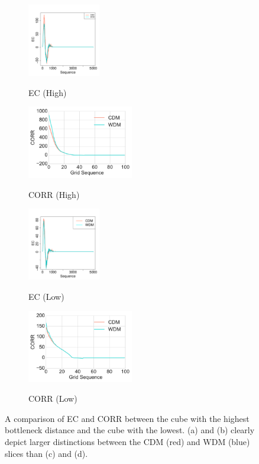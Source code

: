 \documentclass[12pt]{article}
\begin{document}
\begin{figure}[htp!]
  \centering
    \begin{subfigure}{0.21\textwidth}
    \centering
        \caption{EC (High)}
\includegraphics[height = 1.25in]{figure_13_max_margin_2euler.pdf}
    \label{fig:valid1}
  \end{subfigure}
    \begin{subfigure}{0.24\textwidth}
    \centering
        \caption{CORR (High)}
\includegraphics[height = 1.25in]{figure_13_max_margin_corr.pdf}
    \label{fig:valid2}
  \end{subfigure}
    \begin{subfigure}{0.21\textwidth}
    \centering
        \caption{EC (Low)}
\includegraphics[height = 1.25in]{figure_13_min_margin_2euler.pdf}
    \label{fig:valid3}
  \end{subfigure}
    \begin{subfigure}{0.24\textwidth}
    \centering
        \caption{CORR (Low)}
\includegraphics[height = 1.25in]{figure_13_min_margin_corr.pdf}
    \label{fig:valid4}
  \end{subfigure}
    \caption{A comparison of EC and CORR between the cube with the highest bottleneck distance and the cube with the lowest. (a) and (b) clearly depict larger distinctions between the CDM (red) and WDM (blue) slices than (c) and (d).}
    \label{fig:validationfigs}
\end{figure}
\end{document}
